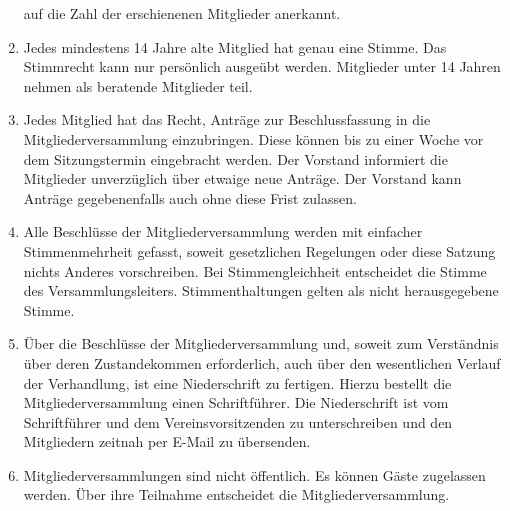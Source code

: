 \documentclass[12pt]{article}
\begin{document}
\begin{enumerate}[label=(\arabic*)]
	      auf die Zahl der erschienenen Mitglieder anerkannt.
	\item Jedes mindestens 14 Jahre alte Mitglied hat genau eine Stimme. Das Stimmrecht kann nur
	      persönlich ausgeübt werden. Mitglieder unter 14 Jahren nehmen als beratende Mitglieder teil.
	\item Jedes Mitglied hat das Recht, Anträge zur Beschlussfassung in die Mitgliederversammlung
	      einzubringen. Diese können bis zu einer Woche vor dem Sitzungstermin eingebracht werden. Der
	      Vorstand informiert die Mitglieder unverzüglich über etwaige neue Anträge. Der Vorstand kann
	      Anträge gegebenenfalls auch ohne diese Frist zulassen.
	\item Alle Beschlüsse der Mitgliederversammlung werden mit einfacher Stimmenmehrheit gefasst,
	      soweit gesetzlichen Regelungen oder diese Satzung nichts Anderes vorschreiben. Bei
	      Stimmengleichheit entscheidet die Stimme des Versammlungsleiters. Stimmenthaltungen gelten als
	      nicht herausgegebene Stimme.
	\item Über die Beschlüsse der Mitgliederversammlung und, soweit zum Verständnis über deren
	      Zustandekommen erforderlich, auch über den wesentlichen Verlauf der Verhandlung, ist eine
	      Niederschrift zu fertigen. Hierzu bestellt die Mitgliederversammlung einen Schriftführer.
	      Die Niederschrift ist vom Schriftführer und dem Vereinsvorsitzenden zu unterschreiben und den
	      Mitgliedern zeitnah per E-Mail zu übersenden.
	\item Mitgliederversammlungen sind nicht öffentlich. Es können Gäste zugelassen werden. Über ihre
	      Teilnahme entscheidet die Mitgliederversammlung.
\end{enumerate}
\end{document}
